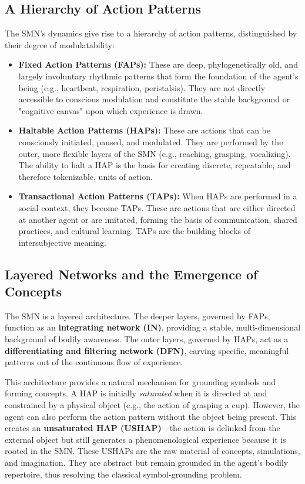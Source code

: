 \subsection*{A Hierarchy of Action Patterns}
The SMN's dynamics give rise to a hierarchy of action patterns, distinguished by their degree of modulatability:
\begin{itemize}
    \item \textbf{Fixed Action Patterns (FAPs):} These are deep, phylogenetically old, and largely involuntary rhythmic patterns that form the foundation of the agent's being (e.g., heartbeat, respiration, peristalsis). They are not directly accessible to conscious modulation and constitute the stable background or "cognitive canvas" upon which experience is drawn.
    \item \textbf{Haltable Action Patterns (HAPs):} These are actions that can be consciously initiated, paused, and modulated. They are performed by the outer, more flexible layers of the SMN (e.g., reaching, grasping, vocalizing). The ability to halt a HAP is the basis for creating discrete, repeatable, and therefore tokenizable, units of action.
    \item \textbf{Transactional Action Patterns (TAPs):} When HAPs are performed in a social context, they become TAPs. These are actions that are either directed at another agent or are imitated, forming the basis of communication, shared practices, and cultural learning. TAPs are the building blocks of intersubjective meaning.
\end{itemize}

\subsection*{Layered Networks and the Emergence of Concepts}
The SMN is a layered architecture. The deeper layers, governed by FAPs, function as an \textbf{integrating network (IN)}, providing a stable, multi-dimensional background of bodily awareness. The outer layers, governed by HAPs, act as a \textbf{differentiating and filtering network (DFN)}, carving specific, meaningful patterns out of the continuous flow of experience.

This architecture provides a natural mechanism for grounding symbols and forming concepts. A HAP is initially \textit{saturated} when it is directed at and constrained by a physical object (e.g., the action of grasping a cup). However, the agent can also perform the action pattern without the object being present. This creates an \textbf{unsaturated HAP (USHAP)}—the action is delinked from the external object but still generates a phenomenological experience because it is rooted in the SMN. These USHAPs are the raw material of concepts, simulations, and imagination. They are abstract but remain grounded in the agent's bodily repertoire, thus resolving the classical symbol-grounding problem.

